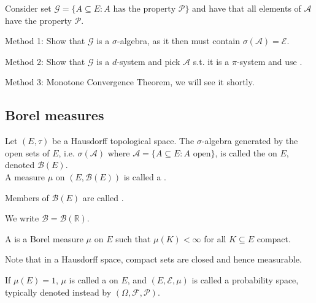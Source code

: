\begin{answer} \label{ans:1}
	Consider set $\mathcal{G} = \{A \subseteq E : A \text{ has the property } \mathcal{P}\}$ and have that all elements of $\mathcal{A}$ have the property $\mathcal{P}$.

	Method 1: Show that $\mathcal{G}$ is a $\sigma$-algebra, as it then must contain $\sigma(\mathcal{A}) = \mathcal{E}$.

	Method 2: Show that $\mathcal{G}$ is a $d$-system and pick $\mathcal{A}$ s.t. it is a $\pi$-system and use .

	Method 3: Monotone Convergence Theorem, we will see it shortly.
\end{answer}

\subsection{Borel measures}

\begin{definition}
	Let $(E, \tau)$ be a Hausdorff topological space.
	The $\sigma$-algebra generated by the open sets of $E$, i.e. $\sigma(\mathcal{A})$ where $\mathcal{A} = \{A \subseteq E : A \text{ open}\}$, is called the  on $E$, denoted $\mathcal B(E)$. \\
	A measure $\mu$ on $(E, \mathcal B(E))$ is called a .

	Members of $\mathcal B(E)$ are called .
\end{definition}

\begin{notation}
	We write $\mathcal B = \mathcal B(\mathbb R)$.
\end{notation}

\begin{definition}
	A  is a Borel measure $\mu$ on $E$ such that $\mu(K) < \infty$ for all $K \subseteq E$ compact.
\end{definition}
Note that in a Hausdorff space, compact sets are closed and hence measurable.

\begin{definition}
	If $\mu(E) = 1$, $\mu$ is called a  on $E$, and $(E, \mathcal{E}, \mu)$ is called a probability space, typically denoted instead by $(\Omega, \mathcal{F}, \mathcal{P})$.
\end{definition}

